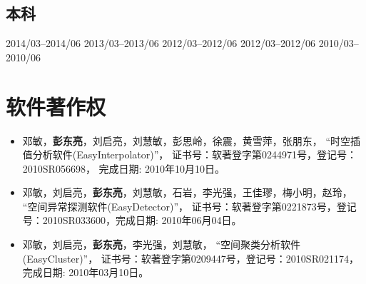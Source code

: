 \documentclass{resume}
\begin{document}
\subsection{本科}
\begin{itemize}[parsep=0ex]
    {2014/03--2014/06}
    {2013/03--2013/06}    
    {2012/03--2012/06}
    {2012/03--2012/06}    
    {2010/03--2010/06}    
\end{itemize}


\section{软件著作权}
\begin{itemize}[parsep=0ex]
\item 邓敏，\textbf{彭东亮}，刘启亮，刘慧敏，彭思岭，徐震，黄雪萍，张朋东，
    ``时空插值分析软件(EasyInterpolator)''，
   证书号：软著登字第0244971号，登记号：2010SR056698， 完成日期: 2010年10月10日。
\item 邓敏，刘启亮，\textbf{彭东亮}，刘慧敏，石岩，李光强，王佳璆，梅小明，赵玲，
   ``空间异常探测软件(EasyDetector)''，
   证书号：软著登字第0221873号，登记号：2010SR033600，完成日期: 2010年06月04日。
\item 邓敏，刘启亮，\textbf{彭东亮}，李光强，刘慧敏，
   ``空间聚类分析软件(EasyCluster)''，
   证书号：软著登字第0209447号，登记号：2010SR021174，完成日期: 2010年03月10日。   
\end{itemize}
\end{document}
